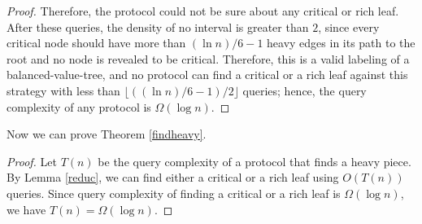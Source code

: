 \begin{proof}
Therefore, the protocol could not be sure about any critical or rich leaf. After these queries, the density of no interval is greater than $2$, since every critical node should have more than $(\ln n)/6-1$ heavy edges in its path to the root and no node is revealed to be critical. Therefore, this is a valid labeling of a balanced-value-tree, and no protocol can find a critical or a rich leaf against this strategy with less than $\lfloor ((\ln n)/6 -1)/2 \rfloor$ queries; hence, the query complexity of any protocol is $\Omega( \log n)$. 
\end{proof}

Now we can prove Theorem \ref{findheavy}.
\findheavy*
\begin{proof}
Let $T(n)$ be the query complexity of a protocol that finds a heavy piece. By Lemma \ref{reduc}, we can find either a critical or a rich leaf using $O(T(n))$ queries. Since query complexity of finding a critical or a rich leaf is $\Omega( \log n)$, we have $T(n) = \Omega( \log n)$.
\end{proof}